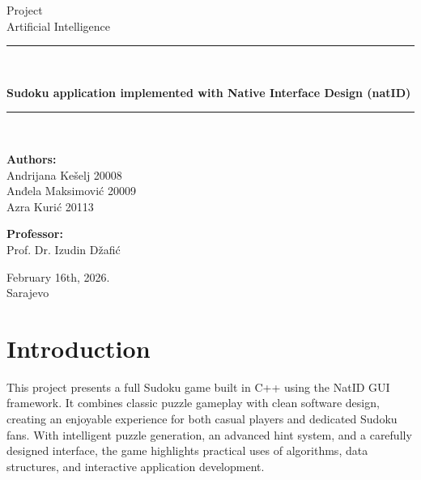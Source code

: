 \documentclass[12pt,a4paper]{article}
\begin{document}
\begin{titlepage}
    \centering
    \vspace*{2cm}
    
    {\large Project \\ Artificial Intelligence \par}
    
    \vspace{3cm}
    
    \rule{\linewidth}{1.5pt} \\
    \vspace{0.5cm}
    {\huge \textbf{Sudoku application implemented with Native Interface Design (natID)} \par}
    \vspace{0.5cm}
    \rule{\linewidth}{1.5pt} \\
    
    \vfill
    
    \begin{minipage}{0.4\textwidth}
        \begin{flushleft}
            \textbf{Authors:}\\
            Andrijana Kešelj 20008\\
            Anđela Maksimović 20009\\
            Azra Kurić 20113
        \end{flushleft}
    \end{minipage}
    \hfill
    \begin{minipage}{0.4\textwidth}
        \begin{flushright}
            \textbf{Professor:}\\
            Prof. Dr. Izudin Džafić
        \end{flushright}
    \end{minipage}
    
    \vspace{2cm}
    
    February 16th, 2026. \\
    Sarajevo
\end{titlepage}

\tableofcontents
\newpage

\section{Introduction}
This project presents a full Sudoku game built in C++ using the NatID GUI framework. It combines classic puzzle gameplay with clean software design, creating an enjoyable experience for both casual players and dedicated Sudoku fans. With intelligent puzzle generation, an advanced hint system, and a carefully designed interface, the game highlights practical uses of algorithms, data structures, and interactive application development.
\end{document}
